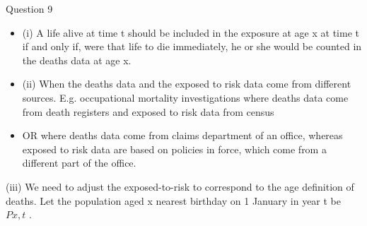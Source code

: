 \documentclass[a4paper,12pt]{article}
\begin{document}
\begin{enumerate}
\newpage
Question 9%
\begin{itemize}
\item (i) A life alive at time t should be included in the exposure at age x at time t if and only
if, were that life to die immediately, he or she would be counted in the deaths data at age x.
\item (ii) When the deaths data and the exposed to risk data come from different sources. E.g. occupational mortality investigations where deaths data come from death registers and exposed to risk data from census
\item OR
where deaths data come from claims department of an office, whereas exposed to risk data are based on policies in force, which come from a different part of the office.
\end{itemize}
(iii)
We need to adjust the exposed-to-risk to correspond to the age definition of deaths.
Let the population aged x nearest birthday on 1 January in year t be $P x,t$ .


\end{enumerate}
\end{document}

